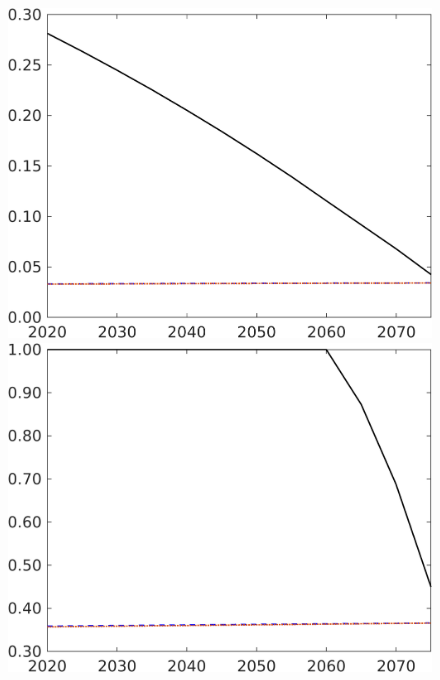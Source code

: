 \begin{figure}[h!!]
\begin{minipage}[]{0.32\textwidth}
	\end{minipage}
	\begin{minipage}[]{0.32\textwidth}
		\includegraphics[width=1\textwidth]{../../codding_model/own_basedOnFried/optimalPol_elastS_DisuSci/figures/all_1705/sff_CompEffOPT_NOT_NoTaus_spillover0_sep1_BN0_ineq0_red0_etaa0.79_lgd0.png}
	\end{minipage}
	\begin{minipage}[]{0.32\textwidth}
		\includegraphics[width=1\textwidth]{../../codding_model/own_basedOnFried/optimalPol_elastS_DisuSci/figures/all_1705/sn_CompEffOPT_NOT_NoTaus_spillover0_sep1_BN0_ineq0_red0_etaa0.79_lgd0.png}
	\end{minipage}


\end{figure}
